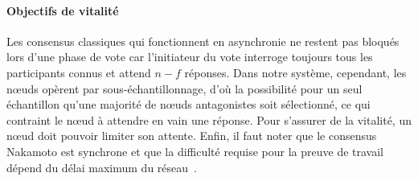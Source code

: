 \documentclass[a4,twocolumn,10pt]{article}
\newcommand{\editinsert}[1]{{\color{blue}#1}}
\theoremstyle{definition}
\begin{document}
\paragraph{Objectifs de vitalité}
Les consensus classiques qui fonctionnent en asynchronie ne restent pas bloqués lors d'une phase de vote car l'initiateur du vote interroge toujours tous les participants connus et attend $n - f$ réponses.
Dans notre système, cependant, les nœuds opèrent par sous-échantillonnage, d'où la possibilité pour un seul échantillon qu'une majorité de nœuds antagonistes soit sélectionné, ce qui contraint le nœud à attendre en vain une réponse. Pour s'assurer de la vitalité, un nœud doit pouvoir limiter son attente. Enfin, il faut noter que le consensus Nakamoto est synchrone et que la difficulté requise pour la preuve de travail dépend du délai maximum du réseau~\cite{PassSS17}. 

\end{document}
